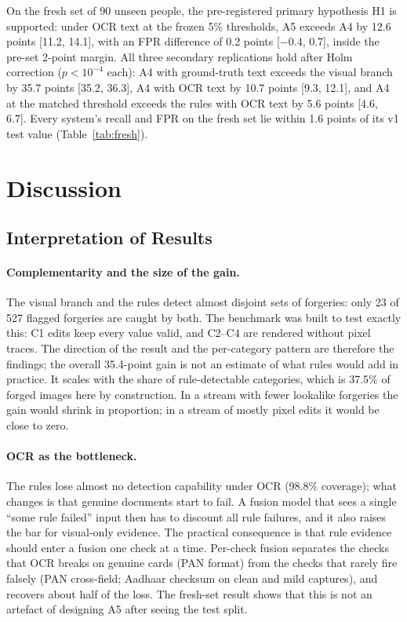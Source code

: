 \documentclass[conference]{IEEEtran}
\begin{document}


On the fresh set of 90 unseen people, the pre-registered primary
hypothesis H1 is supported: under OCR text at the frozen 5\% thresholds,
A5 exceeds A4 by 12.6 points [11.2, 14.1], with an FPR difference of
0.2 points [$-0.4$, 0.7], inside the pre-set 2-point margin. All three
secondary replications hold after Holm correction ($p<10^{-4}$ each): A4
with ground-truth text exceeds the visual branch by 35.7 points [35.2,
36.3], A4 with OCR text by 10.7 points [9.3, 12.1], and A4 at the
matched threshold exceeds the rules with OCR text by 5.6 points [4.6,
6.7]. Every system's recall and FPR on the fresh set lie within 1.6
points of its v1 test value (Table~\ref{tab:fresh}).

\section{Discussion}
\label{sec:discussion}

\subsection{Interpretation of Results}
\label{subsec:interpretation}

\paragraph*{Complementarity and the size of the gain.} The visual branch and the
rules detect almost disjoint sets of forgeries: only 23 of 527 flagged
forgeries are caught by both. The benchmark was built to test exactly
this: C1 edits keep every value valid, and C2--C4 are rendered without
pixel traces. The direction of the result and the per-category
pattern are therefore the findings; the overall 35.4-point gain is not
an estimate of what rules would add in practice. It scales with the
share of rule-detectable categories, which is 37.5\% of forged images
here by construction. In a stream with fewer lookalike forgeries the
gain would shrink in proportion; in a stream of mostly pixel edits it
would be close to zero.

\paragraph*{OCR as the bottleneck.} The
rules lose almost no detection capability under OCR (98.8\% coverage);
what changes is that genuine documents start to fail. A fusion model
that sees a single ``some rule failed'' input then has to discount all
rule failures, and it also raises the bar for visual-only evidence. The
practical consequence is that rule evidence should enter a fusion one
check at a time. Per-check fusion separates the checks that OCR breaks
on genuine cards (PAN format) from the checks that rarely fire falsely
(PAN cross-field; Aadhaar checksum on clean and mild captures), and recovers
about half of the loss. The fresh-set result shows that this is not an
artefact of designing A5 after seeing the test split.
\end{document}
